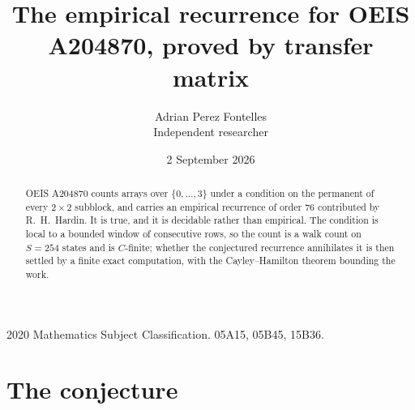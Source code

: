 \documentclass[11pt,a4paper]{article}
\title{The empirical recurrence for OEIS A204870, proved by transfer matrix}
\author{Adrian Perez Fontelles\\ \small Independent researcher}
\date{2 September 2026}
\theoremstyle{plain}
\theoremstyle{definition}
\begin{document}
\maketitle

\begin{abstract}
OEIS A204870 counts arrays over $\{0,\dots,3\}$ under a condition on the permanent of every
$2\times2$ subblock, and carries an empirical recurrence of order $76$ contributed by
R.~H.~Hardin. It is true, and it is decidable rather than empirical. The condition is local to
a bounded window of consecutive rows, so the count is a walk count on $S=254$ states and is
$C$-finite; whether the conjectured recurrence annihilates it is then settled by a finite exact
computation, with the Cayley--Hamilton theorem bounding the work.
\end{abstract}

\noindent\small 2020 Mathematics Subject Classification. 05A15, 05B45, 15B36.\normalsize

\section{The conjecture}
\end{document}
